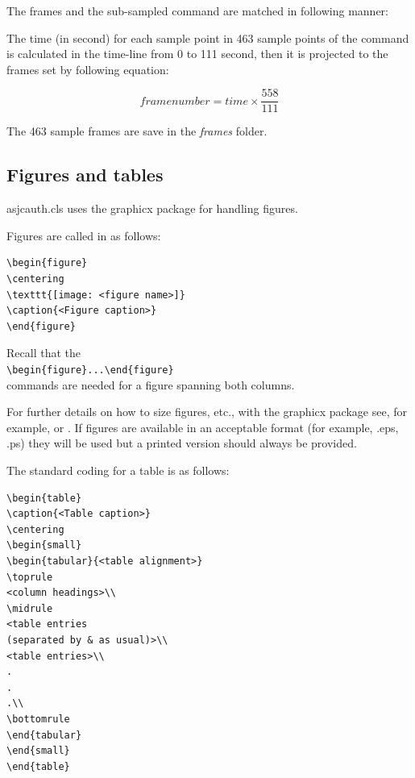 \documentclass[times]{asjcauth}
\begin{document}
The frames and the sub-sampled command are matched in following manner:

The time (in second) for each sample point in 463 sample points of the command is calculated in the time-line from 0 to 111 second, then it is projected to the frames set by following equation:

\begin{equation}
frame number=time\times\frac{558}{111}
\end{equation}  

The 463 sample frames are save in the \emph{frames} folder.

\subsection{Figures and tables} \textsf{asjcauth.cls} uses the
\textsf{graphicx} package for handling figures.

\newpage

Figures are called in as follows:
\begin{verbatim}
\begin{figure}
\centering
\texttt{[image: <figure name>]}
\caption{<Figure caption>}
\end{figure}
\end{verbatim}
Recall that the\\
\verb"\begin{figure}...\end{figure}"\\
commands are needed for a
figure spanning both columns.

For further details on how to size figures, etc., with the
\textsf{graphicx} package see, for example, \cite{R1}
or \cite{R3}. If figures are available in an
acceptable format (for example, .eps, .ps) they will be used but a
printed version should always be provided. \medbreak

The standard coding for a table is as follows:

\begin{verbatim}
\begin{table}
\caption{<Table caption>}
\centering
\begin{small}
\begin{tabular}{<table alignment>}
\toprule
<column headings>\\
\midrule
<table entries
(separated by & as usual)>\\
<table entries>\\
.
.
.\\
\bottomrule
\end{tabular}
\end{small}
\end{table}
\end{verbatim}
\end{document}
